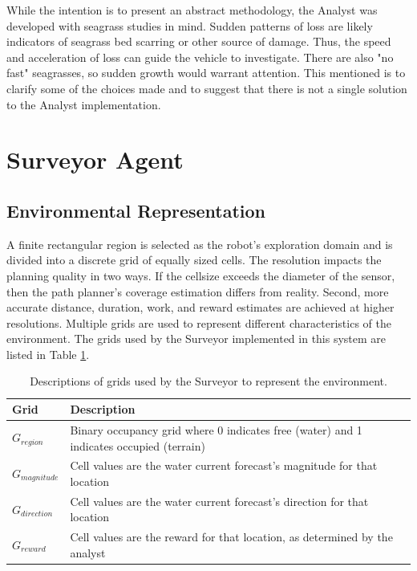 \documentclass{tamuccthesis}
\begin{document}
While the intention is to present an abstract methodology, the Analyst was developed with seagrass studies in mind. Sudden patterns of loss are likely indicators of seagrass bed scarring or other source of damage. Thus, the speed and acceleration of loss can guide the vehicle to investigate. There are also "no fast" seagrasses, so sudden growth would warrant attention. This mentioned is to clarify some of the choices made and to suggest that there is not a single solution to the Analyst implementation. 

\section{Surveyor Agent}

\subsection{Environmental Representation}

A finite rectangular region is selected as the robot's exploration domain and is divided into a discrete grid of equally sized cells. The resolution impacts the planning quality in two ways. If the cellsize exceeds the diameter of the sensor, then the path planner's coverage estimation differs from reality. Second, more accurate distance, duration, work, and reward estimates are achieved at higher resolutions. Multiple grids are used to represent different characteristics of the environment. The grids used by the Surveyor implemented in this system are listed in Table \ref{tbl:grids}. 

\begin{table}[H]\small
\begin{tabular}{|l|l|}
\hline
Grid            & Description \\
\hline
$G_{region}$    & Binary occupancy grid where 0 indicates free (water) and 1 indicates occupied (terrain) \\
\hline
$G_{magnitude}$ & Cell values are the water current forecast's magnitude for that location \\
\hline
$G_{direction}$ & Cell values are the water current forecast's direction for that location \\
\hline
$G_{reward}$    & Cell values are the reward for that location, as determined by the analyst \\    
\hline
\end{tabular}
\caption{Descriptions of grids used by the Surveyor to represent the environment.}
\label{tbl:grids}
\end{table}
\end{document}

